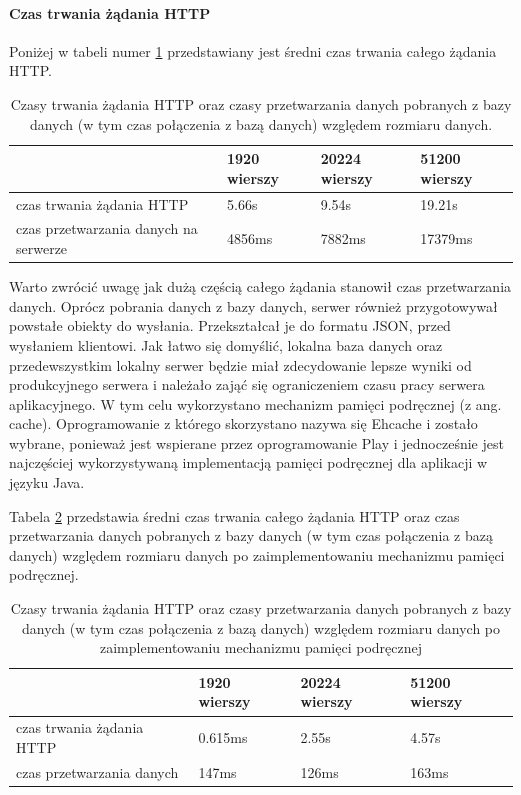 \documentclass[a4paper,12pt,twoside]{article}
\begin{document}
\paragraph{Czas  trwania żądania HTTP}
Poniżej w tabeli numer \ref{table:httpRequestTime} przedstawiany jest średni czas trwania całego żądania HTTP.
\begin{table}[H] 
\begin{tabular}{| p{3cm} | p{3cm} | p{3cm} | p{3cm}|}
\hline
& 1920 wierszy &  20224 wierszy & 51200 wierszy\\ 
\hline
czas trwania żądania HTTP& 5.66s & 9.54s & 19.21s \\ \hline  
czas przetwarzania danych na serwerze& 4856ms& 7882ms& 17379ms\\ \hline  
\end{tabular}
\caption{Czasy trwania żądania HTTP  oraz czasy przetwarzania danych pobranych z bazy danych (w tym czas połączenia z bazą danych) względem rozmiaru danych. }
\label{table:httpRequestTime}
\end{table}
Warto zwrócić uwagę jak dużą częścią całego żądania stanowił czas przetwarzania danych. Oprócz pobrania danych z bazy danych, serwer również przygotowywał
powstałe obiekty do wysłania. Przekształcał je do formatu JSON, przed wysłaniem
klientowi.
Jak łatwo się domyślić, lokalna baza danych oraz przedewszystkim lokalny serwer będzie miał zdecydowanie lepsze wyniki od produkcyjnego serwera i należało 
zająć się ograniczeniem czasu pracy serwera aplikacyjnego.
W tym celu wykorzystano mechanizm pamięci podręcznej (z ang. cache).
Oprogramowanie z którego skorzystano nazywa się Ehcache \cite{cache} i 
zostało wybrane, ponieważ jest wspierane przez oprogramowanie Play
i jednocześnie jest najczęściej wykorzystywaną implementacją pamięci podręcznej
dla aplikacji w języku Java.  

Tabela \ref{table:httpRequestTimeCache} przedstawia średni czas trwania 
całego żądania HTTP oraz czas przetwarzania danych pobranych z bazy danych
(w tym czas połączenia z bazą danych) względem rozmiaru danych po zaimplementowaniu
mechanizmu pamięci podręcznej.
\begin{table} [H]
\begin{tabular}{| p{3cm} | p{3cm} | p{3cm} | p{3cm}|}
\hline
& 1920 wierszy &  20224 wierszy & 51200 wierszy\\ 
\hline
czas trwania żądania HTTP& 0.615ms & 2.55s& 4.57s \\ \hline  
czas przetwarzania danych& 147ms& 126ms& 163ms\\ \hline  
\end{tabular}
\caption{Czasy trwania żądania HTTP  oraz czasy przetwarzania danych pobranych z bazy danych (w tym czas połączenia z bazą danych) względem rozmiaru danych po zaimplementowaniu mechanizmu pamięci podręcznej}

\label{table:httpRequestTimeCache}
\end{table}
\end{document}
